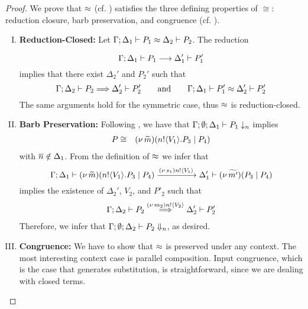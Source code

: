 \begin{proof}
	\noi We prove that $\approx$ (cf. ) satisfies the three defining properties of $\cong$:
	reduction closure, barb preservation, and congruence (cf. ).
%
\begin{enumerate}[I.]

\item	{\bf Reduction-Closed:}
	Let
		$\Gamma; \Delta_1 \vdash P_1 \approx \Delta_2 \vdash P_2$. The reduction

	\[
		\Gamma; \Delta_1 \vdash P_1 \longrightarrow \Delta_1' \vdash P_1'
	\]
%
	\noi implies that there exist $\Delta_2'$ and $P_2'$ such that 
  \[
		\Gamma; \Delta_2 \vdash P_2 \stackrel{}{\Longrightarrow} \Delta_2' \vdash P_2'
		\qquad \text{and} \qquad
		\Gamma; \Delta_1 \vdash P_1' \approx \Delta_2' \vdash P_2'
		\]
 The same arguments hold for the symmetric case, thus $\approx$ is reduction-closed.

	\item {\bf Barb Preservation:} Following , we have that
$		\Gamma; \emptyset; \Delta_1 \vdash P_1 \downarrow_{n}$
	implies 
	\begin{eqnarray*}
		P &\cong& (\nu\, \widetilde{m})(n ! \langle V_1 \rangle . P_3 \;|\; P_4)
	\end{eqnarray*}
with $\overline{n} \notin \Delta_1$.
	\noi From the definition of $\approx$ we infer that
%
\[
	\Gamma; \Delta_1 \vdash (\nu\, \widetilde{m})(n ! \langle V_1 \rangle . P_3 \;|\; P_4) \xrightarrow{(\nu\, s_1) n ! \langle V_1 \rangle} \Delta_1' \vdash (\nu\, \widetilde{m'})(P_3 \;|\; P_4)
\]
	\noi implies the existence of $\Delta_2'$, $V_2$, and $P'_2$ such that
%
	\begin{eqnarray*}
		\Gamma; \Delta_2 \vdash P_2 \stackrel{(\nu\, m_2) n ! \langle V_2 \rangle}{\Longrightarrow} \Delta_2' \vdash P_2'
	\end{eqnarray*}
   Therefore, we infer that 
$		\Gamma; \emptyset; \Delta_2 \vdash P_2 \Downarrow_{n}$, as desired.

	\item {\bf Congruence:}
	We have to show that  $\approx$
	is preserved under any context.
	The most interesting context case is parallel composition.
	Input congruence, which is the case that generates substitution,
	is straightforward, since we are dealing with closed terms.


\end{enumerate}
\end{proof}

